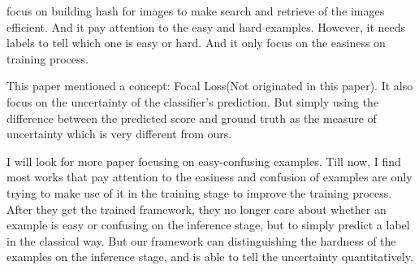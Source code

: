\documentclass{article}
\begin{document}
\cite{deephash} focus on building hash for images to make search and retrieve of the images efficient. And it pay attention to the easy and hard examples. However, it needs labels to tell which one is easy or hard. And it only focus on the easiness on training process.

\cite{focal_loss} This paper mentioned a concept: Focal Loss(Not originated in this paper). It also focus on the uncertainty of the classifier’s prediction. But simply using the difference between the predicted score and ground truth as the measure of uncertainty which is very different from ours.

I will look for more paper focusing on easy-confusing examples. Till now, I find most works that pay attention to the easiness and confusion of examples are only trying to make use of it in the training stage to improve the training process. After they get the trained framework, they no longer care about whether an example is easy or confusing on the inference stage, but to simply predict a label in the classical way. But our framework can distinguishing the hardness of the examples on the inference stage, and is able to tell the uncertainty quantitatively.
\end{document}
